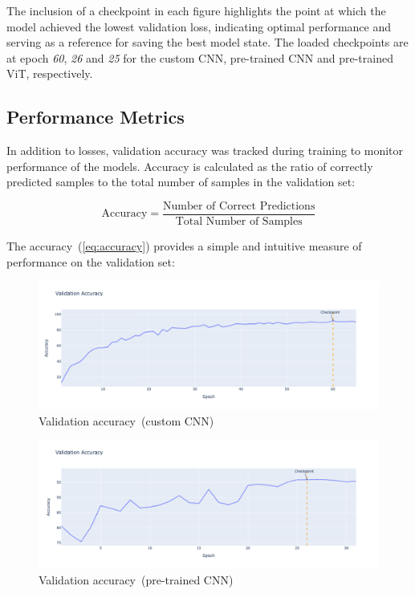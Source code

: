 The inclusion of a checkpoint in each figure highlights the point at which the model achieved the lowest validation loss, indicating optimal performance and serving as a reference for saving the best model state. The loaded checkpoints are at epoch \textit{60}, \textit{26} and \textit{25} for the custom CNN, pre-trained CNN and pre-trained ViT, respectively.

\subsection{Performance Metrics}

In addition to losses, validation accuracy was tracked during training to monitor performance of the models. Accuracy is calculated as the ratio of correctly predicted samples to the total number of samples in the validation set:

\begin{equation}
    \text{Accuracy} = \frac{\text{Number of Correct Predictions}}{\text{Total Number of Samples}}\label{eq:accuracy}
\end{equation}

The accuracy~(\ref{eq:accuracy}) provides a simple and intuitive measure of performance on the validation set:

\begin{figure}[htbp]
    \centerline{\includegraphics[width=0.9\linewidth]{../../resources/custom_cnn/accuracy.png}}
    \caption{Validation accuracy~(custom CNN)}
    \label{fig:accuracy-custom-cnn}
\end{figure}

\begin{figure}[htbp]
    \centerline{\includegraphics[width=0.9\linewidth]{../../resources/resnet/accuracy.png}}
    \caption{Validation accuracy~(pre-trained CNN)}
    \label{fig:accuracy-pretrained-cnn}
\end{figure}

